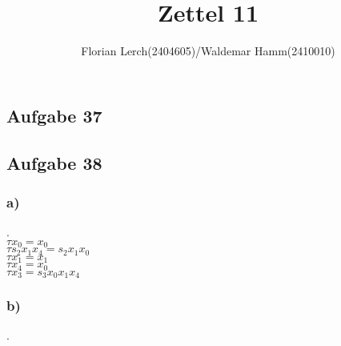 \documentclass[11pt]{amsart}
\title{Zettel 11 }
\author{Florian Lerch(2404605)/Waldemar Hamm(2410010)}
\begin{document}
\maketitle

\subsection*{Aufgabe 37}

\subsection*{Aufgabe 38}
\subsubsection*{a)}.\\
\( \tau x_0 = x_0 \) \\ 
\( \tau s_2x_1x_4 = s_2x_1x_0 \) \\
\( \tau x_1 = x_1 \) \\
\( \tau x_4 = x_0 \) \\
\( \tau x_3 = s_3x_0x_1x_4 \) \\
\subsubsection*{b)}.\\
\end{document}
